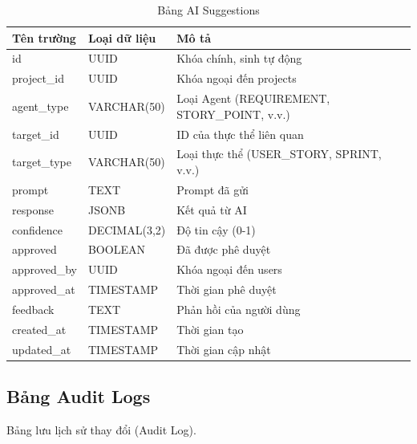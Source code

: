 \documentclass[12pt,a4paper]{report}
\begin{document}
\begin{table}[H]
\centering
\caption{Bảng AI Suggestions}
\begin{tabular}{|p{4cm}|p{4cm}|p{7cm}|}
\hline
\textbf{Tên trường} & \textbf{Loại dữ liệu} & \textbf{Mô tả} \\
\hline
id & UUID & Khóa chính, sinh tự động \\
\hline
project\_id & UUID & Khóa ngoại đến projects \\
\hline
agent\_type & VARCHAR(50) & Loại Agent (REQUIREMENT, STORY\_POINT, v.v.) \\
\hline
target\_id & UUID & ID của thực thể liên quan \\
\hline
target\_type & VARCHAR(50) & Loại thực thể (USER\_STORY, SPRINT, v.v.) \\
\hline
prompt & TEXT & Prompt đã gửi \\
\hline
response & JSONB & Kết quả từ AI \\
\hline
confidence & DECIMAL(3,2) & Độ tin cậy (0-1) \\
\hline
approved & BOOLEAN & Đã được phê duyệt \\
\hline
approved\_by & UUID & Khóa ngoại đến users \\
\hline
approved\_at & TIMESTAMP & Thời gian phê duyệt \\
\hline
feedback & TEXT & Phản hồi của người dùng \\
\hline
created\_at & TIMESTAMP & Thời gian tạo \\
\hline
updated\_at & TIMESTAMP & Thời gian cập nhật \\
\hline
\end{tabular}
\label{tab:ai_suggestions_table}
\end{table}


\subsection{Bảng Audit Logs}

Bảng lưu lịch sử thay đổi (Audit Log).
\end{document}
